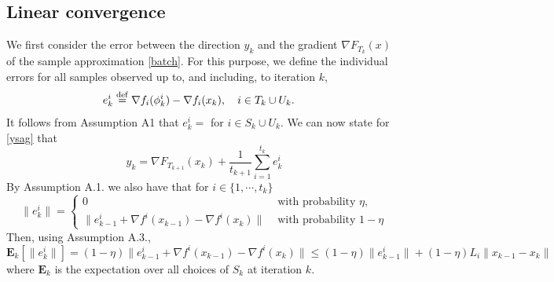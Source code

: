 \documentclass[11pt]{article}
\newcommand{\defeq}{\stackrel{\rm def}{=}}
\newcommand{\E}{\mathbf{E}}
\begin{document}
\subsection{Linear convergence}
We first consider the error between the direction $y_k$ and the gradient $\nabla F_{T_k}(x)$ of the sample approximation \eqref{batch}. For this purpose, we define the individual errors for all samples observed up to, and including, to iteration $k$,  
\begin{align}
 e_k^i &\defeq \nabla f_i(\phi_{k}^i)-\nabla f_i(x_k), \quad i\in T_k \cup U_k.
\end{align}
It follows from Assumption A1 that $e_k^i=$ for $ i \in S_k \cup U_k$.
 We can now state for \eqref{ysag} that
\begin{equation}\label{eq:y}
 y_k = \nabla F_{T_{k+1}}(x_k) + \frac{1}{t_{k+1}}\sum_{i=1}^{t_k} e_k^i 
\end{equation}
By Assumption A.1. we also have that for $i\in \{1,\cdots,t_k\}$
\[
\|e_k^i\| =
 \begin{cases}
  0  & \mbox{ with probability }\eta,\\
  \|e_{k-1}^i + \nabla f^i(x_{k-1}) - \nabla f^i(x_k) \| & \mbox{ with probability }1-\eta
 \end{cases}
\]
 Then, using Assumption A.3., %
\begin{equation}\label{eq:expec}
 \E_k[\|e_k^i\|] = (1-\eta)\|e_{k-1}^i + \nabla f^i(x_{k-1}) - \nabla f^i(x_k) \| \leq (1-\eta)\|e_{k-1}^i\| + (1-\eta)L_i \|x_{k-1} - x_k\|
\end{equation}
where $\E_k$ is the expectation over all choices of $S_k$ at iteration $k$.
\bigskip
\end{document}
